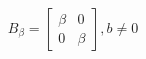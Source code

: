 \documentclass[preview]{standalone}
\begin{document}
\begin{align*}
B_{\beta} = \begin{bmatrix} \beta & 0 \\ 0 & \beta\end{bmatrix}, b \neq 0
\end{align*}
\end{document}
